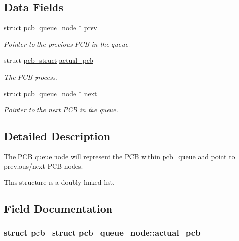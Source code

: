 \subsection*{Data Fields}
\begin{DoxyCompactItemize}
\item 
struct \hyperlink{structpcb__queue__node}{pcb\+\_\+queue\+\_\+node} $\ast$ \hyperlink{structpcb__queue__node_aff49de430038d879a5a58105aa1544d5}{prev}
\begin{DoxyCompactList}\small\item\em Pointer to the previous P\+CB in the queue. \end{DoxyCompactList}\item 
struct \hyperlink{structpcb__struct}{pcb\+\_\+struct} \hyperlink{structpcb__queue__node_aec85184e42b89d83290f46d292a9c2df}{actual\+\_\+pcb}
\begin{DoxyCompactList}\small\item\em The P\+CB process. \end{DoxyCompactList}\item 
struct \hyperlink{structpcb__queue__node}{pcb\+\_\+queue\+\_\+node} $\ast$ \hyperlink{structpcb__queue__node_a6634871cb99f4f53fed51e9b51f6852c}{next}
\begin{DoxyCompactList}\small\item\em Pointer to the next P\+CB in the queue. \end{DoxyCompactList}\end{DoxyCompactItemize}


\subsection{Detailed Description}
The P\+CB queue node will represent the P\+CB within \hyperlink{structpcb__queue}{pcb\+\_\+queue} and point to previous/next P\+CB nodes. 

This structure is a doubly linked list. 

\subsection{Field Documentation}
\subsubsection[{\texorpdfstring{actual\+\_\+pcb}{actual_pcb}}]{\setlength{\rightskip}{0pt plus 5cm}struct {\bf pcb\+\_\+struct} pcb\+\_\+queue\+\_\+node\+::actual\+\_\+pcb}\hypertarget{structpcb__queue__node_aec85184e42b89d83290f46d292a9c2df}{}\label{structpcb__queue__node_aec85184e42b89d83290f46d292a9c2df}


